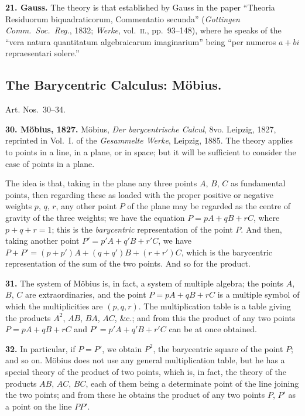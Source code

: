 \documentclass[11pt,a4paper]{book}
\begin{document}
\textbf{21. Gauss.} The theory is that established by Gauss in the paper ``Theoria Residuorum biquadraticorum, Commentatio secunda'' (\textit{Gottingen Comm.\ Soc.\ Reg.}, 1832; \textit{Werke}, vol.~\textsc{ii}., pp.~93--148), where he speaks of the ``vera natura quantitatum algebraicarum imaginarium'' being ``per numeros $a + bi$ repraesentari solere.''

\subsection*{The Barycentric Calculus: M\"obius.}

Art. Nos.~30--34.

\textbf{30. M\"obius, 1827.} M\"obius, \textit{Der barycentrische Calcul}, 8vo. Leipzig, 1827, reprinted in Vol.~I. of the \textit{Gesammelte Werke}, Leipzig, 1885. The theory applies to points in a line, in a plane, or in space; but it will be sufficient to consider the case of points in a plane.

The idea is that, taking in the plane any three points $A$, $B$, $C$ as fundamental points, then regarding these as loaded with the proper positive or negative weights $p$, $q$, $r$, any other point $P$ of the plane may be regarded as the centre of gravity of the three weights; we have the equation $P = pA + qB + rC$, where $p + q + r = 1$; this is the \textit{barycentric} representation of the point $P$. And then, taking another point $P' = p'A + q'B + r'C$, we have $P + P' = (p + p')A + (q + q')B + (r + r')C$, which is the barycentric representation of the sum of the two points. And so for the product.

\textbf{31.} The system of M\"obius is, in fact, a system of multiple algebra; the points $A$, $B$, $C$ are extraordinaries, and the point $P = pA + qB + rC$ is a multiple symbol of which the multiplicities are $(p, q, r)$. The multiplication table is a table giving the products $A^2$, $AB$, $BA$, $AC$, \&c.; and from this the product of any two points $P = pA + qB + rC$ and $P' = p'A + q'B + r'C$ can be at once obtained.

\textbf{32.} In particular, if $P = P'$, we obtain $P^2$, the barycentric square of the point $P$; and so on. M\"obius does not use any general multiplication table, but he has a special theory of the product of two points, which is, in fact, the theory of the products $AB$, $AC$, $BC$, each of them being a determinate point of the line joining the two points; and from these he obtains the product of any two points $P$, $P'$ as a point on the line $PP'$.
\end{document}
